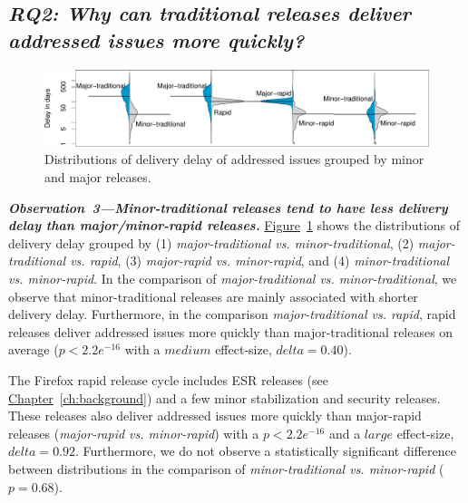 \begin{sloppypar}
\subsection*{\textit{\textbf{RQ2: Why can traditional releases deliver addressed issues more quickly?}}}
\end{sloppypar}

\begin{figure}[t!]
	\centering
	\includegraphics[width=\textwidth,keepaspectratio]
	{chapters/chapter5/figures/rq2/major_vs_minor.pdf}
	\caption{
		Distributions of delivery delay of addressed issues grouped by minor and major
		releases.
	}
	\label{fig:major_vs_minor}
\end{figure}

\begin{sloppypar}
\noindent\textit{\textbf{Observation~3---Minor-traditional releases tend to have
less delivery delay than major/minor-rapid releases.}}
\hyperref[fig:major_vs_minor]{Figure}~\ref{fig:major_vs_minor} shows the distributions of delivery delay
grouped by (1) \textit{major-traditional vs. minor-traditional}, (2)
\textit{major-traditional vs. rapid}, (3) \textit{major-rapid vs. minor-rapid},
and (4) \textit{minor-traditional vs. minor-rapid}. In the comparison of
\textit{major-traditional vs.  minor-traditional}, we observe that
minor-traditional releases are mainly associated with shorter delivery delay.
Furthermore, in the comparison \textit{major-traditional vs. rapid}, rapid
releases deliver addressed issues more quickly than major-traditional releases
on average ($p<2.2e^{-16}$ with a $medium$ effect-size, \ie  $delta=0.40$). 
\end{sloppypar}

The Firefox rapid release cycle includes ESR releases (see
\hyperref[ch:background]{Chapter}~\ref{ch:background}) and a few minor
stabilization and security releases. These releases also deliver addressed
issues more quickly than major-rapid releases (\textit{major-rapid vs.
minor-rapid}) with a $p<2.2e^{-16}$ and a $large$ effect-size, \ie $delta=0.92$.
Furthermore, we do not observe a statistically significant difference between
distributions in the comparison of \textit{minor-traditional vs. minor-rapid}
($p=0.68$).

